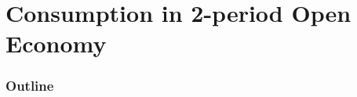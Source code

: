 \documentclass{beamer}
\newcommand{\tb}[1]{{\color{blue}{\textbf{#1}}}}
\newenvironment{mytemize}
{\vfill\itemize[nolistsep,itemsep=\fill,label=\color{blue}{$\triangleright$}]}
  {\enditemize}
\newcommand{\rarr}{$\Rightarrow$\ }
\begin{document}
%	
%

\section{Consumption in 2-period Open Economy}
\begin{frame}
\frametitle{Outline}
\tableofcontents[currentsection]
\end{frame}
\end{document}
